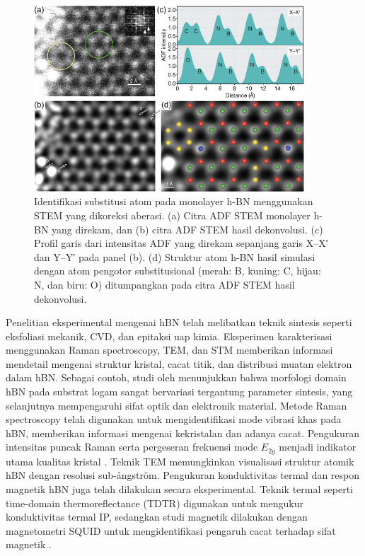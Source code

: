 \begin{figure}[htbp]
  \centering
  \includegraphics[width=0.9\textwidth]{gambar/hBN_stem.jpeg}
  \caption{Identifikasi substitusi atom pada monolayer h-BN menggunakan STEM yang dikoreksi aberasi. 
  (a) Citra ADF STEM monolayer h-BN yang direkam, dan 
  (b) citra ADF STEM hasil dekonvolusi. 
  (c) Profil garis dari intensitas ADF yang direkam sepanjang garis X--X′ dan Y--Y′ pada panel (b). 
  (d) Struktur atom h-BN hasil simulasi dengan atom pengotor substitusional (merah: B, kuning: C, hijau: N, dan biru: O) ditumpangkan pada citra ADF STEM hasil dekonvolusi. \cite{Zhang2020}}
  \label{fig:ADF_hBN_substitusi}
\end{figure}

Penelitian eksperimental mengenai hBN telah melibatkan teknik sintesis seperti eksfoliasi mekanik, CVD, dan epitaksi uap kimia.
Eksperimen karakterisasi menggunakan Raman spectroscopy, TEM, dan STM memberikan informasi mendetail mengenai struktur kristal, cacat titik, dan distribusi muatan elektron dalam hBN.
Sebagai contoh, studi oleh \cite{Bhimanapati2016} menunjukkan bahwa morfologi domain hBN pada substrat logam sangat bervariasi tergantung parameter sintesis, yang selanjutnya mempengaruhi sifat optik dan elektronik material.
Metode Raman spectroscopy telah digunakan untuk mengidentifikasi mode vibrasi khas pada hBN, memberikan informasi mengenai kekristalan dan adanya cacat.
Pengukuran intensitas puncak Raman serta pergeseran frekuensi mode \(E_{2g}\) menjadi indikator utama kualitas kristal \cite{Wang2017}.
Teknik TEM memungkinkan visualisasi struktur atomik hBN dengan resolusi sub-ångström.
Pengukuran konduktivitas termal dan respon magnetik hBN juga telah dilakukan secara eksperimental.
Teknik termal seperti time-domain thermoreflectance (TDTR) digunakan untuk mengukur konduktivitas termal IP, sedangkan studi magnetik dilakukan dengan magnetometri SQUID untuk mengidentifikasi pengaruh cacat terhadap sifat magnetik \cite{Zhang2020}.

